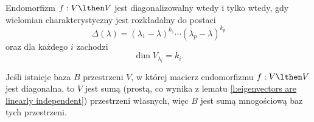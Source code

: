 \begin{theorem}
    \label{t:endomorphism is diagonalizable iff polynomial...}
    Endomorfizm $f : V \lthen V$ jest diagonalizowalny wtedy i tylko wtedy, gdy wielomian charakterystyczny jest rozkładalny do postaci
    \[ \Delta(\lambda) = (\lambda_1 - \lambda)^{k_1}\cdots(\lambda_p - \lambda)^{k_p} \]
    oraz dla każdego $i$ zachodzi
    \[ \dim V_{\lambda_i} = k_i. \]
\end{theorem}

\begin{remark}
    \label{r:about base of diagonal matrix of endomorphism}
    Jeśli istnieje baza $B$ przestrzeni $V$, w której macierz endomorfizmu $f: V \lthen V$ jest diagonalna, to $V$ jest sumą (prostą, co wynika z lematu \ref{l:eigenvectors are linearly independent}) przestrzeni własnych, więc $B$ jest sumą mnogościową baz tych przestrzeni.
\end{remark}

